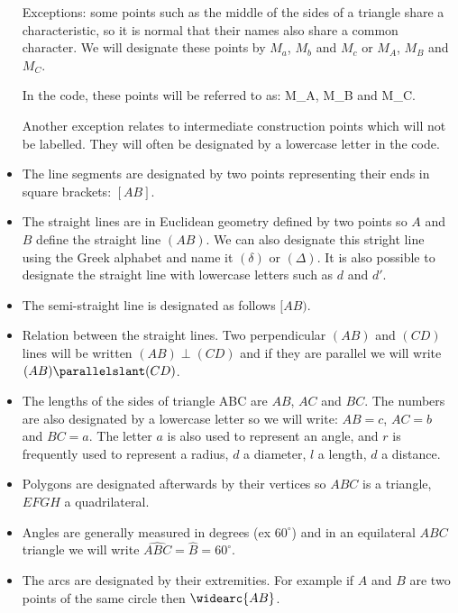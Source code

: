 \begin{itemize}
Exceptions: some points such as the middle of the sides of a triangle share a characteristic, so it is normal that their names also share a common character. We will designate these points by $M_a$, $M_b$ and $M_c$ or $M_A$, $M_B$ and $M_C$.

In the code, these points will be referred to as: M\_A, M\_B and M\_C.

Another exception relates to intermediate construction points which will not be labelled. They will often be designated by a lowercase letter in the code.

\item The line segments are designated by two points representing their ends in square brackets: $[AB]$. 

\item The straight lines are in Euclidean geometry defined by two points so $A$ and $B$ define the straight line $(AB)$. We can also designate this stright line using the Greek alphabet and name it $(\delta)$ or $(\Delta)$. It is also possible to designate the straight line with lowercase letters such as $d$ and $d'$.

\item The semi-straight line is designated as follows $[AB)$.

\item Relation between the straight lines. Two perpendicular $(AB)$ and $(CD)$ lines will be written $(AB) \perp (CD)$ and if they are parallel we will write $(AB) \parallelslant (CD)$.

\item The lengths of the sides of triangle ABC are $AB$, $AC$ and $BC$. The numbers are also designated by a lowercase letter so we will write: $AB=c$, $AC=b$ and $BC=a$. The letter $a$ is also used to represent an angle, and $r$ is frequently used to represent a radius, $d$ a diameter, $l$ a length, $d$ a distance.

\item Polygons are designated afterwards by their vertices so $ABC$ is a triangle, $EFGH$ a quadrilateral.

\item Angles are generally measured in degrees (ex $60^\circ$) and in an equilateral $ABC$ triangle we will write $\widehat{ABC}=\widehat{B}=60^\circ$.

\item The arcs are designated by their extremities. For example if $A$ and $B$ are two points of the same circle then $\widearc{AB}$.


\end{itemize}
